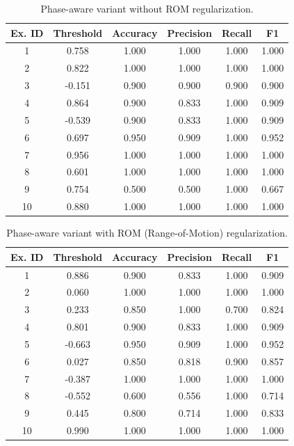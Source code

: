 \begin{table}[htbp]
    \centering
    \caption{Phase-aware variant without ROM regularization.}
    \label{tab:phase-aware-no-rom}
    \begin{tabularx}{0.8\textwidth}{@{} c c c c c c @{}}
        \toprule
        \textbf{Ex. ID} & \textbf{Threshold} & \textbf{Accuracy} & \textbf{Precision} & \textbf{Recall} & \textbf{F1} \\
        \midrule
        1  &  0.758 & 1.000 & 1.000 & 1.000 & 1.000 \\
        2  &  0.822 & 1.000 & 1.000 & 1.000 & 1.000 \\
        3  & -0.151 & 0.900 & 0.900 & 0.900 & 0.900 \\
        4  &  0.864 & 0.900 & 0.833 & 1.000 & 0.909 \\
        5  & -0.539 & 0.900 & 0.833 & 1.000 & 0.909 \\
        6  &  0.697 & 0.950 & 0.909 & 1.000 & 0.952 \\
        7  &  0.956 & 1.000 & 1.000 & 1.000 & 1.000 \\
        8  &  0.601 & 1.000 & 1.000 & 1.000 & 1.000 \\
        9  &  0.754 & 0.500 & 0.500 & 1.000 & 0.667 \\
        10 &  0.880 & 1.000 & 1.000 & 1.000 & 1.000 \\
        \bottomrule
    \end{tabularx}
\end{table}

\begin{table}[htbp]
    \centering
    \caption{Phase-aware variant with ROM (Range-of-Motion) regularization.}
    \label{tab:phase-aware-rom}
    \begin{tabularx}{0.8\textwidth}{@{} c c c c c c @{}}
        \toprule
        \textbf{Ex. ID} & \textbf{Threshold} & \textbf{Accuracy} & \textbf{Precision} & \textbf{Recall} & \textbf{F1} \\
        \midrule
        1  &  0.886 & 0.900 & 0.833 & 1.000 & 0.909 \\
        2  &  0.060 & 1.000 & 1.000 & 1.000 & 1.000 \\
        3  &  0.233 & 0.850 & 1.000 & 0.700 & 0.824 \\
        4  &  0.801 & 0.900 & 0.833 & 1.000 & 0.909 \\
        5  & -0.663 & 0.950 & 0.909 & 1.000 & 0.952 \\
        6  &  0.027 & 0.850 & 0.818 & 0.900 & 0.857 \\
        7  & -0.387 & 1.000 & 1.000 & 1.000 & 1.000 \\
        8  & -0.552 & 0.600 & 0.556 & 1.000 & 0.714 \\
        9  &  0.445 & 0.800 & 0.714 & 1.000 & 0.833 \\
        10 &  0.990 & 1.000 & 1.000 & 1.000 & 1.000 \\
        \bottomrule
    \end{tabularx}
\end{table}

